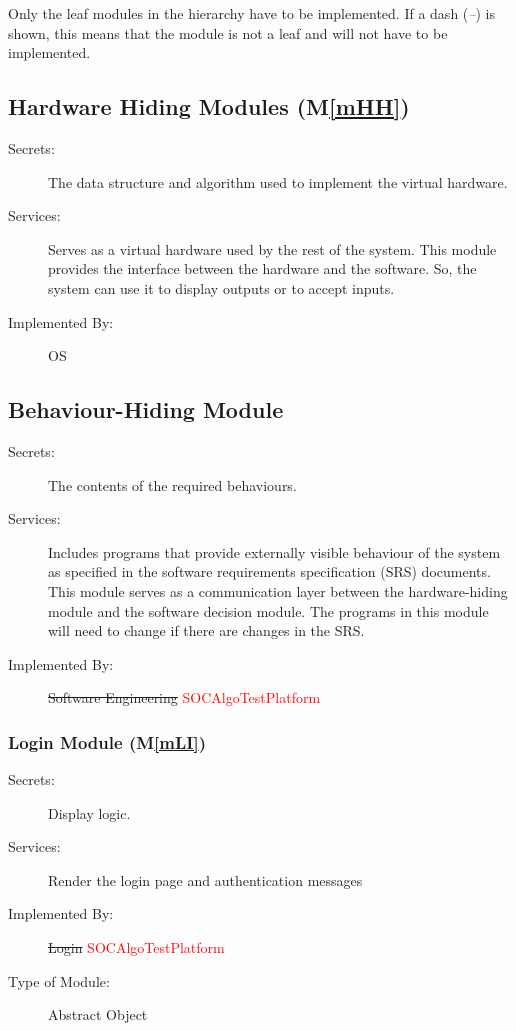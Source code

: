 \documentclass[12pt, titlepage]{article}
\newcommand{\mref}[1]{M\ref{#1}}
\begin{document}
Only the leaf modules in the hierarchy have to be implemented. If a dash
(\emph{--}) is shown, this means that the module is not a leaf and will not have
to be implemented.

\subsection{Hardware Hiding Modules (\mref{mHH})}

\begin{description}
\item[Secrets:]The data structure and algorithm used to implement the virtual
  hardware.
\item[Services:]Serves as a virtual hardware used by the rest of the
  system. This module provides the interface between the hardware and the
  software. So, the system can use it to display outputs or to accept inputs.
\item[Implemented By:] OS
\end{description}

\subsection{Behaviour-Hiding Module}

\begin{description}
\item[Secrets:]The contents of the required behaviours.
\item[Services:]Includes programs that provide externally visible behaviour of
  the system as specified in the software requirements specification (SRS)
  documents. This module serves as a communication layer between the
  hardware-hiding module and the software decision module. The programs in this
  module will need to change if there are changes in the SRS.
\item[Implemented By:] \sout{Software Engineering}  \textcolor{red}{SOCAlgoTestPlatform}
\end{description}

\subsubsection{Login Module (\mref{mLI})}

\begin{description}
\item[Secrets:] Display logic.
\item[Services:] Render the login page and authentication messages
\item[Implemented By:] \sout{Login}  \textcolor{red}{SOCAlgoTestPlatform}
\item[Type of Module:] Abstract Object
\end{description}
\end{document}
